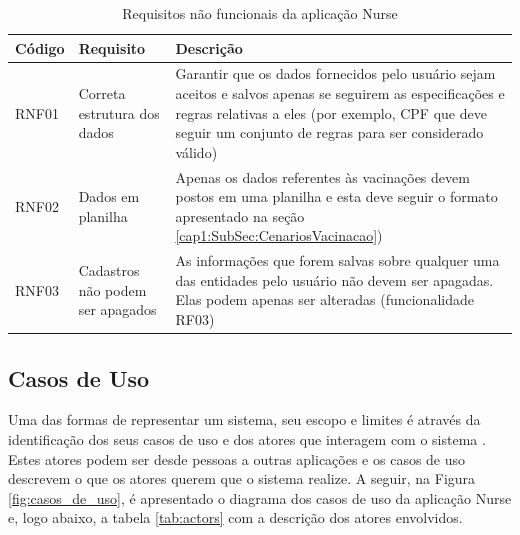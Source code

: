 \begin{table}[ht!]
  \centering
  {
  \begin{tabularx}{\textwidth}{
    | >{\centering\arraybackslash}m{} 
    | >{\centering\arraybackslash}X 
    | >{\raggedright\arraybackslash}X | }
    \hline
    \rowcolor{green!100}
    \textbf{Código} & \textbf{Requisito} & \textbf{Descrição} \\ \hline \hline
    RNF01  &  Correta estrutura dos dados              & Garantir que os dados fornecidos pelo usuário sejam aceitos e salvos apenas se seguirem as especificações e regras relativas a eles (por exemplo, CPF que deve seguir um conjunto de regras para ser considerado válido)   \\ \hline
    RNF02  &  Dados em planilha & Apenas os dados referentes às vacinações devem postos em uma planilha e esta deve seguir o formato apresentado na seção \ref{cap1:SubSec:CenariosVacinacao}) \\ \hline
    RNF03  &  Cadastros não podem ser apagados  & As informações que forem salvas sobre qualquer uma das entidades pelo usuário não devem ser apagadas. Elas podem apenas ser alteradas (funcionalidade RF03) \\ \hline
  \end{tabularx}}
\caption{Requisitos não funcionais da aplicação Nurse}
\label{tab:rnf}
\end{table}

\subsection{Casos de Uso}
\label{cap4:Subsec:CasosDeUso}

Uma das formas de representar um sistema, seu escopo e limites é através da identificação dos seus casos de uso e dos atores que interagem com o sistema \cite{schneider2001applying}. Estes atores podem ser desde pessoas a outras aplicações e os casos de uso descrevem o que os atores querem que o sistema realize. A seguir, na Figura \ref{fig:casos_de_uso}, é apresentado o diagrama dos casos de uso da aplicação Nurse e, logo abaixo, a tabela \ref{tab:actors} com a descrição dos atores envolvidos.

